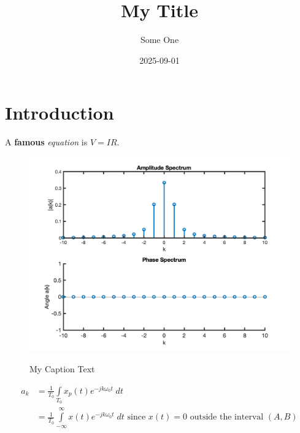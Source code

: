\documentclass{article}
\title{My Title}
\author{Some One}
\date{2025-09-01}
\begin{document}
\maketitle

\section{Introduction}

A \textbf{famous} \textit{equation} is $V = IR$.

\begin{figure}
  \centering
  \includegraphics[alt={As long a description as you like}]{myfig.png}
  \caption{My Caption Text}
\end{figure}

\begin{align*}
  a_k &= \frac{1}{T_0} \int\limits_{T_0} x_p(t) e^{-jk\omega_0 t}\; dt\\
  &= \frac{1}{T_0} \int\limits_{-\infty}^{\infty} x(t) e^{-jk\omega_0 t}\; dt \mbox{ since } x(t) = 0 \mbox{ outside the interval } (A,B)\\
\end{align*}
\end{document}
